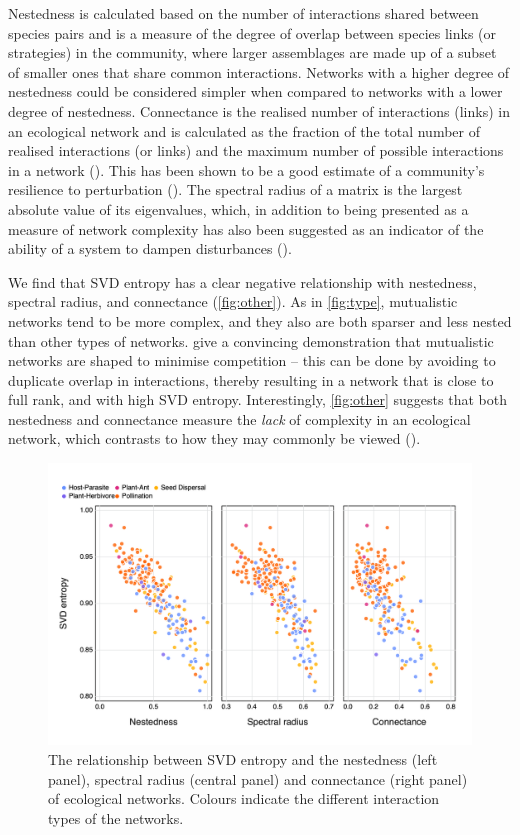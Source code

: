\begin{refsection}
Nestedness is calculated based on the number of interactions shared between
species pairs and is a measure of the degree of overlap between species links
(or strategies) in the community, where larger assemblages are made up of a
subset of smaller ones that share common interactions. Networks with a higher
degree of nestedness could be considered simpler when compared to networks with
a lower degree of nestedness. Connectance is the realised number of interactions
(links) in an ecological network and is calculated as the fraction of the total
number of realised interactions (or links) and the maximum number of possible
interactions in a network (\cite{Martinez1992ConCon}). This has been shown to be a
good estimate of a community's resilience to perturbation
(\cite{Dunne2002NetStr}). The spectral radius of a matrix is the largest absolute
value of its eigenvalues, which, in addition to being presented as a measure of
network complexity has also been suggested as an indicator of the ability of a
system to dampen disturbances (\cite{Phillips2011StrEco}).

We find that SVD entropy has a clear negative relationship with nestedness,
spectral radius, and connectance (\autoref{fig:other}). As in
\autoref{fig:type}, mutualistic networks tend to be more complex, and they also
are both sparser and less nested than other types of networks.
\cite{Bastolla2009ArcMut} give a convincing demonstration that
mutualistic networks are shaped to minimise competition -- this can be done by
avoiding to duplicate overlap in interactions, thereby resulting in a network
that is close to full rank, and with high SVD entropy. Interestingly, \autoref{fig:other} suggests that both nestedness and connectance measure the \emph{lack} of complexity in an ecological network, which contrasts to how they may commonly be viewed (\cite{Landi2018Complexity}).

\begin{figure}[h]
    \centering
    \includegraphics[width=\textwidth]{figures/others_v_entropy.png}
    \caption{The relationship between SVD entropy and the nestedness (left
panel), spectral radius (central panel) and connectance (right panel) of
ecological networks. Colours indicate the different interaction types of the
networks.}
    \label{fig:other}
\end{figure}


\end{refsection}
